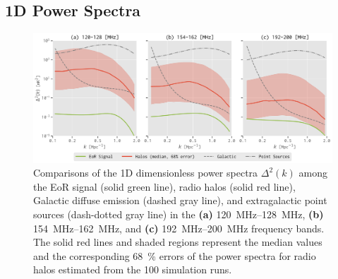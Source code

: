 \documentclass[twocolumn]{aastex62}
\begin{document}
\subsection{1D Power Spectra}
\label{sec:ps1d}

\begin{figure}
  \centering
  \includegraphics[width=\textwidth]{ps1d-3bands}
  \caption{\label{fig:ps1d-3bands}%
    Comparisons of the 1D dimensionless power spectra $\Delta^2(k)$
    among the EoR signal (solid green line), radio halos (solid red line),
    Galactic diffuse emission (dashed gray line), and extragalactic point
    sources (dash-dotted gray line) in the
    \textbf{(a)} \SIrange{120}{128}{\MHz},
    \textbf{(b)} \SIrange{154}{162}{\MHz}, and
    \textbf{(c)} \SIrange{192}{200}{\MHz} frequency bands.
    The solid red lines and shaded regions represent the median values
    and the corresponding \SI{68}{\percent} errors of the power spectra
    for radio halos estimated from the 100 simulation runs.
  }
\end{figure}
\end{document}
